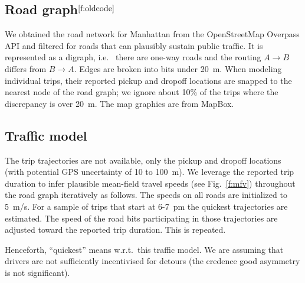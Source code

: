\documentclass[12pt,notitlepage]{article}
\begin{document}
\subsection{Road graph${}^{\ref{f:oldcode}}$} 
\label{s:graph}



We obtained the road network for Manhattan
%
from the OpenStreetMap Overpass API
and filtered for roads that can plausibly sustain public traffic.
%
%
It is represented as a digraph,
i.e.~%
there are one-way roads 
and
the routing $A \to B$ differs from $B \to A$.
%
Edges are broken into bits under \SI{20}{m}.
%
%
When modeling individual trips,
their reported pickup and dropoff locations
are snapped to the nearest node of the road graph;
we ignore about 10\% of the trips 
where the discrepancy is over \SI{20}{m}.
%
%
%
%
The map graphics are from MapBox.



\subsection{Traffic model} \label{s:traffic}

The trip trajectories are not available,
only the pickup and dropoff locations
(with potential GPS uncertainty of 10 to \SI{100}{m}).
%
%
We leverage the reported trip duration to
infer plausible mean-field travel speeds
(see Fig.~\ref{f:mfv})
throughout the road graph
iteratively as follows.
%
The speeds on all roads are initialized to \SI{5}{m/s}.
%
For a sample of trips that start at 6-7~pm
the quickest trajectories are estimated.
%
The speed of the road bits participating in those trajectories
are adjusted toward the reported trip duration.
%
This is repeated.
%
%

%

Henceforth, ``quickest''
means
w.r.t.~this traffic model.
%
%
We are assuming that drivers
are not sufficiently incentivised for detours
(the credence good asymmetry is not significant).
\end{document}
